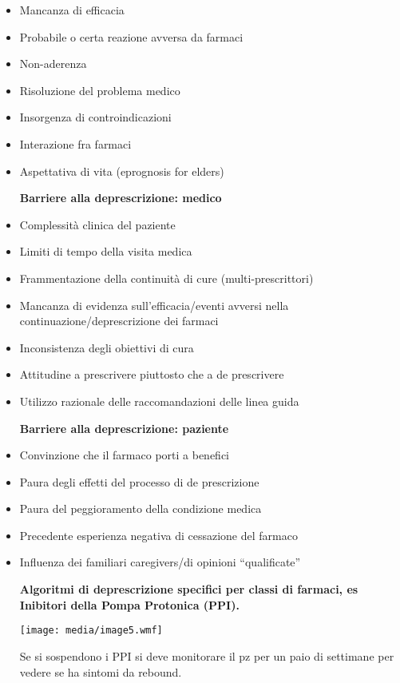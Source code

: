 \documentclass[]{article}
\begin{document}
\begin{itemize}
\item
  Mancanza di efficacia
\item
  Probabile o certa reazione avversa da farmaci
\item
  Non-aderenza
\item
  Risoluzione del problema medico
\item
  Insorgenza di controindicazioni
\item
  Interazione fra farmaci
\item
  Aspettativa di vita (eprognosis for elders)

  \textbf{Barriere alla deprescrizione: medico}
\end{itemize}

\begin{itemize}
\item
  Complessità clinica del paziente
\item
  Limiti di tempo della visita medica
\item
  Frammentazione della continuità di cure (multi-prescrittori)
\item
  Mancanza di evidenza sull'efficacia/eventi avversi nella
  continuazione/deprescrizione dei farmaci
\item
  Inconsistenza degli obiettivi di cura
\item
  Attitudine a prescrivere piuttosto che a de prescrivere
\item
  Utilizzo razionale delle raccomandazioni delle linea guida

  \textbf{Barriere alla deprescrizione: paziente}
\end{itemize}

\begin{itemize}
\item
  Convinzione che il farmaco porti a benefici
\item
  Paura degli effetti del processo di de prescrizione
\item
  Paura del peggioramento della condizione medica
\item
  Precedente esperienza negativa di cessazione del farmaco
\item
  Influenza dei familiari caregivers/di opinioni ``qualificate''

  \textbf{Algoritmi di deprescrizione specifici per classi di farmaci,
  es Inibitori della Pompa Protonica (PPI).}

  \texttt{[image: media/image5.wmf]}

  Se si sospendono i PPI si deve monitorare il pz per un paio di
  settimane per vedere se ha sintomi da rebound.
\end{itemize}
\end{document}
